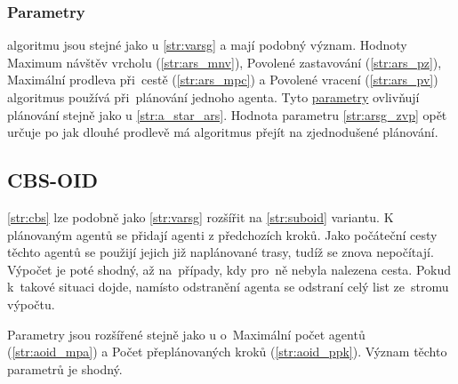 \subsubsection{Parametry}\label{subsubsec:cbs_parametry}

 algoritmu jsou stejné jako u \ref{str:varsg} a mají podobný význam.
Hodnoty Maximum návštěv vrcholu (\ref{str:ars_mnv}), Povolené zastavování (\ref{str:ars_pz}),
Maximální prodleva při~cestě (\ref{str:ars_mpc}) a Povolené vracení (\ref{str:ars_pv})
algoritmus používá při~plánování jednoho agenta.
Tyto \hyperref[subsubsec:ars_parametry]{parametry} ovlivňují plánování stejně jako u \ref{str:a_star_ars}.
Hodnota parametru \ref{str:arsg_zvp} opět určuje po jak dlouhé prodlevě má algoritmus přejít na zjednodušené plánování.

\subsection{CBS-OID}\label{subsec:cbsoid}

\ref{str:cbs} lze podobně jako \ref{str:varsg} rozšířit na \ref{str:suboid} variantu.
K plánovaným agentů se přidají agenti z předchozích kroků.
Jako počáteční cesty těchto agentů se použijí jejich již naplánované trasy, tudíž se znova nepočítají.
Výpočet je poté shodný, až na~případy, kdy pro~ně nebyla nalezena cesta.
Pokud k~takové situaci dojde, namísto odstranění agenta se odstraní celý list ze~stromu výpočtu.

Parametry jsou rozšířené stejně jako u  o~Maximální počet agentů (\ref{str:aoid_mpa})
a Počet přeplánovaných kroků (\ref{str:aoid_ppk}).
Význam těchto parametrů je shodný.
